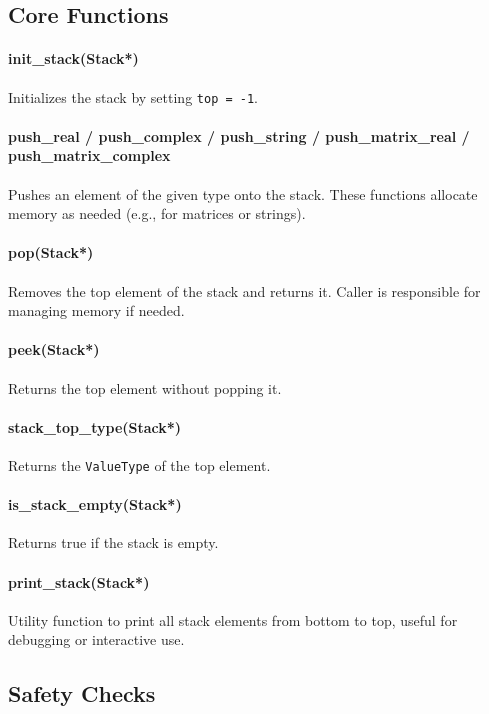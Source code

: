 \documentclass[12pt]{article}
\begin{document}
\subsection{Core Functions}

\paragraph{init\_stack(Stack*)}
Initializes the stack by setting \texttt{top = -1}.

\paragraph{push\_real / push\_complex / push\_string / push\_matrix\_real / push\_matrix\_complex}
Pushes an element of the given type onto the stack. These functions allocate memory as needed (e.g., for matrices or strings).

\paragraph{pop(Stack*)}
Removes the top element of the stack and returns it. Caller is responsible for managing memory if needed.

\paragraph{peek(Stack*)}
Returns the top element without popping it.

\paragraph{stack\_top\_type(Stack*)}
Returns the \texttt{ValueType} of the top element.

\paragraph{is\_stack\_empty(Stack*)}
Returns true if the stack is empty.

\paragraph{print\_stack(Stack*)}
Utility function to print all stack elements from bottom to top, useful for debugging or interactive use.

\subsection{Safety Checks}
\end{document}
